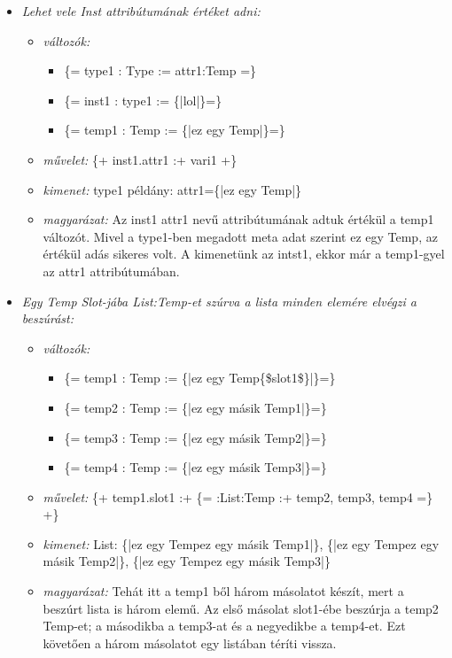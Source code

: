 {\begin{itemize}
\item \emph{Lehet vele Inst attribútumának értéket adni:}
\begin{itemize}
\item \emph{változók:}
\begin{itemize}
\item \{= type1 : Type  := attr1:Temp =\}
\item \{= inst1 : type1 := \{|lol|\}=\}
\item \{= temp1 : Temp  := \{|ez egy Temp|\}=\}
\end{itemize}
\item \emph{művelet:}
\{+ inst1.attr1 :+ vari1 +\} 
\item \emph{kimenet:}
type1 példány: attr1=\{|ez egy Temp|\}
\item \emph{magyarázat:}
Az inst1 attr1 nevű attribútumának adtuk értékül a temp1 változót.
Mivel a type1-ben megadott meta adat szerint ez egy Temp, az értékül adás sikeres volt.
A kimenetünk az intst1, ekkor már a temp1-gyel az attr1 attribútumában.
\end{itemize}

\item \emph{Egy Temp Slot-jába List:Temp-et szúrva a lista minden elemére elvégzi a beszúrást:}
\begin{itemize}
\item \emph{változók:}
\begin{itemize}
\item \{= temp1 : Temp  := \{|ez egy Temp\{\$slot1\$\}|\}=\}
\item \{= temp2 : Temp  := \{|ez egy másik Temp1|\}=\}
\item \{= temp3 : Temp  := \{|ez egy másik Temp2|\}=\}
\item \{= temp4 : Temp  := \{|ez egy másik Temp3|\}=\}
\end{itemize}
\item \emph{művelet:}
\{+ temp1.slot1 :+ \{= :List:Temp :+ temp2, temp3, temp4 =\} +\} 
\item \emph{kimenet:}
List: \{|ez egy Tempez egy másik Temp1|\}, \{|ez egy Tempez egy másik Temp2|\}, \{|ez egy Tempez egy másik Temp3|\}
\item \emph{magyarázat:}
Tehát itt a temp1 ből három másolatot készít, mert a beszúrt lista is három elemű.
Az első másolat slot1-ébe beszúrja a temp2 Temp-et; a másodikba a temp3-at és a negyedikbe a temp4-et.
Ezt követően a három másolatot egy listában téríti vissza.
\end{itemize}


\end{itemize}}
